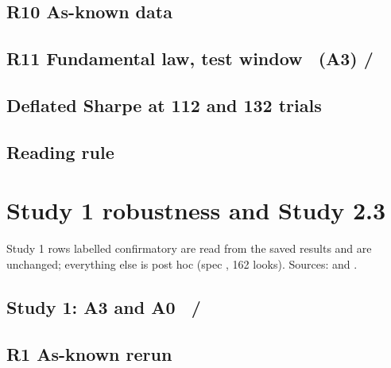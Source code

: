 \subsection*{R10 As-known data \hfill \tagp}
{\footnotesize\setlength{\tabcolsep}{4pt}}\par\medskip
\subsection*{R11 Fundamental law, test window \hfill \tagc\ (A3) / \tagp}
{\footnotesize\setlength{\tabcolsep}{4pt}}\par\medskip
\subsection*{Deflated Sharpe at 112 and 132 trials \hfill \tagp}
{\footnotesize\setlength{\tabcolsep}{4pt}}\par\medskip
\subsection*{Reading rule \hfill \tagp}
{\footnotesize\setlength{\tabcolsep}{4pt}}\par\medskip

\clearpage\section{Study 1 robustness and Study 2.3}
Study 1 rows labelled confirmatory are read from the saved results and are unchanged; everything else is post hoc (spec , 162 looks). Sources:  and .
\subsection*{Study 1: A3 and A0 \hfill \tagc\ / \tagp}
{\scriptsize\setlength{\tabcolsep}{3pt}}\par\medskip
{\scriptsize\setlength{\tabcolsep}{3pt}}\par\medskip
{\footnotesize\setlength{\tabcolsep}{3pt}}\par\medskip
\subsection*{R1 As-known rerun \hfill \tagp}
{\footnotesize\setlength{\tabcolsep}{3pt}}\par\medskip
{\footnotesize\setlength{\tabcolsep}{3pt}}\par\medskip
